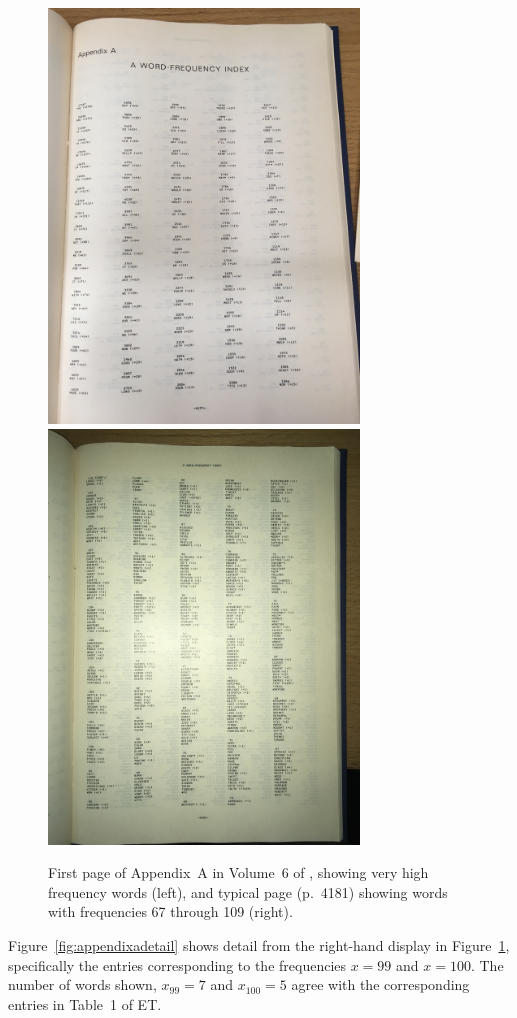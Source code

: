 \begin{figure}
	\centering
	\includegraphics[width=3.25in,angle=270]{../compendium/Figures/IMG_4943.jpg}
	\includegraphics[width=3.25in,angle=270]{../compendium/Figures/IMG_4950.jpg}
	\caption{First page of Appendix~A in Volume~6 of \citet[p.~4177]{Spevack:1968qd}, showing very high frequency words (left), and typical page (p.~4181) showing words with frequencies 67 through 109 (right). }
	\label{fig:appendixa}
\end{figure}

Figure~\ref{fig:appendixadetail} shows detail from the right-hand display in Figure~\ref{fig:appendixa}, specifically the entries corresponding to the frequencies $x=99$ and $x=100$.  The number of words shown, $x_{99}=7$ and $x_{100}=5$ agree with the corresponding entries in Table~1 of ET.

